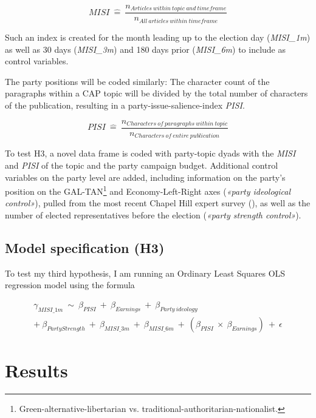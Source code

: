 \documentclass[11pt,a4paper]{article}
\begin{document}
\begin{equation}
    MISI\ \widehat{=}\ \frac{n_{Articles\ within\ topic\ and\ timeframe}}{n_{All\ articles\ within\ timeframe}}
\end{equation}

Such an index is created for the month leading up to the election day (\textit{MISI\_1m}) as well as 30 days (\textit{MISI\_3m}) and 180 days prior (\textit{MISI\_6m}) to include as control variables.

The party positions will be coded similarly: The character count of the paragraphs within a CAP topic will be divided by the total number of characters of the publication, resulting in a party-issue-salience-index \textit{PISI}.

\begin{equation}
    PISI\ \widehat{=}\ \frac{n_{Characters\ of\ paragraphs\ within\ topic}}{n_{Characters\ of\ entire\ publication}}
\end{equation}

To test H3, a novel data frame is coded with party-topic dyads with the \textit{MISI} and \textit{PISI} of the topic and the party campaign budget. Additional control variables on the party level are added, including information on the party’s position on the GAL-TAN\footnote{Green-alternative-libertarian vs. traditional-authoritarian-nationalist.} and Economy-Left-Right axes (\textit{«party ideological control»}), pulled from the most recent Chapel Hill expert survey (\cite{jolly_chapel_2022}), as well as the number of elected representatives before the election (\textit{«party strength control»}). 


\subsection{Model specification (H3)}
To test my third hypothesis, I am running an Ordinary Least Squares OLS regression model using the formula

\begin{equation}
    \begin{split}
        \gamma_{MISI\_1m}\ \sim\ \beta_{PISI}\ +\ \beta_{Earnings}\ +\ \beta_{Party\ ideology}\\
         +\ \beta_{Party Strength}\ +\ \beta_{MISI\_3m}\ +\ \beta_{MISI\_6m}\ +\ (\beta_{PISI}\ \times\ \beta_{Earnings})\ +\ \epsilon  
    \end{split}
\end{equation}


\section{Results}
\end{document}

